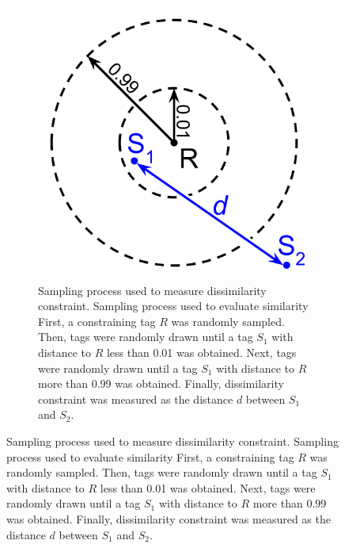 \begin{figure}

\begin{center}
\begin{subfigure}[b]{\linewidth}
\begin{minipage}{0.5\linewidth}

\includegraphics[width=0.75\linewidth]{img/elasticity-statistic}

\end{minipage}
\begin{minipage}{0.5\linewidth}
\caption{
Sampling process used to measure dissimilarity constraint.
Sampling process used to evaluate similarity 
First, a constraining tag $R$ was randomly sampled.
Then, tags were randomly drawn until a tag $S_1$ with distance to $R$ less than 0.01 was obtained.
Next, tags were randomly drawn until a tag $S_1$ with distance to $R$ more than 0.99 was obtained.
Finally, dissimilarity constraint was measured as the distance $d$ between $S_1$ and $S_2$.
}
\label{fig:dissimilarity_statistic}
\end{minipage}

\end{subfigure}


\end{center}
\end{figure}

